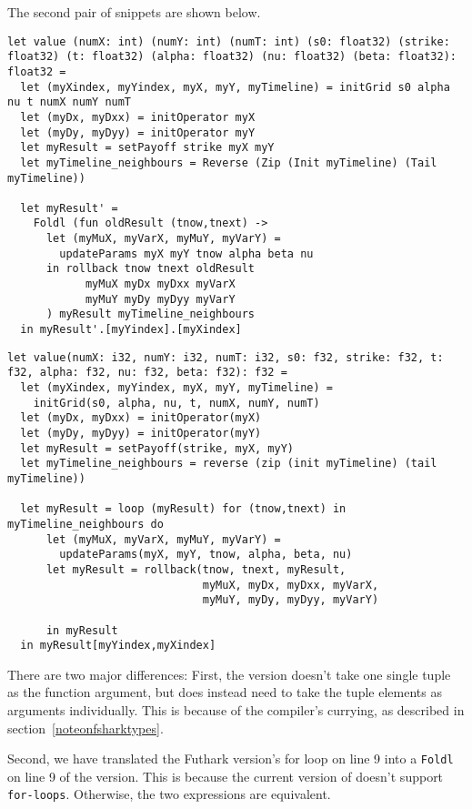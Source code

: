 The second pair of snippets are shown below.

\begin{verbatim}
let value (numX: int) (numY: int) (numT: int) (s0: float32) (strike: float32) (t: float32) (alpha: float32) (nu: float32) (beta: float32): float32 =
  let (myXindex, myYindex, myX, myY, myTimeline) = initGrid s0 alpha nu t numX numY numT
  let (myDx, myDxx) = initOperator myX
  let (myDy, myDyy) = initOperator myY
  let myResult = setPayoff strike myX myY
  let myTimeline_neighbours = Reverse (Zip (Init myTimeline) (Tail myTimeline))

  let myResult' = 
    Foldl (fun oldResult (tnow,tnext) ->
      let (myMuX, myVarX, myMuY, myVarY) =
        updateParams myX myY tnow alpha beta nu
      in rollback tnow tnext oldResult
            myMuX myDx myDxx myVarX
            myMuY myDy myDyy myVarY
      ) myResult myTimeline_neighbours
  in myResult'.[myYindex].[myXindex]
\end{verbatim}

\begin{lstlisting}[language=Futhark]
let value(numX: i32, numY: i32, numT: i32, s0: f32, strike: f32, t: f32, alpha: f32, nu: f32, beta: f32): f32 =
  let (myXindex, myYindex, myX, myY, myTimeline) =
    initGrid(s0, alpha, nu, t, numX, numY, numT)
  let (myDx, myDxx) = initOperator(myX)
  let (myDy, myDyy) = initOperator(myY)
  let myResult = setPayoff(strike, myX, myY)
  let myTimeline_neighbours = reverse (zip (init myTimeline) (tail myTimeline))

  let myResult = loop (myResult) for (tnow,tnext) in myTimeline_neighbours do
      let (myMuX, myVarX, myMuY, myVarY) =
        updateParams(myX, myY, tnow, alpha, beta, nu)
      let myResult = rollback(tnow, tnext, myResult,
                              myMuX, myDx, myDxx, myVarX,
                              myMuY, myDy, myDyy, myVarY)

      in myResult
  in myResult[myYindex,myXindex]
\end{lstlisting}
There are two major differences: First, the \fshark{} version doesn't take one
single tuple as the function argument, but does instead need to take the tuple
elements as arguments individually. This is because of the \fsharp{} compiler's
currying, as described in section~\ref{noteonfsharktypes}.

Second, we have translated the Futhark version's for loop on line 9 into a
\texttt{Foldl} on line 9 of the \fshark{} version. This is because the current
version of \fshark{} doesn't support \texttt{for-loops}.
Otherwise, the two expressions are equivalent.

